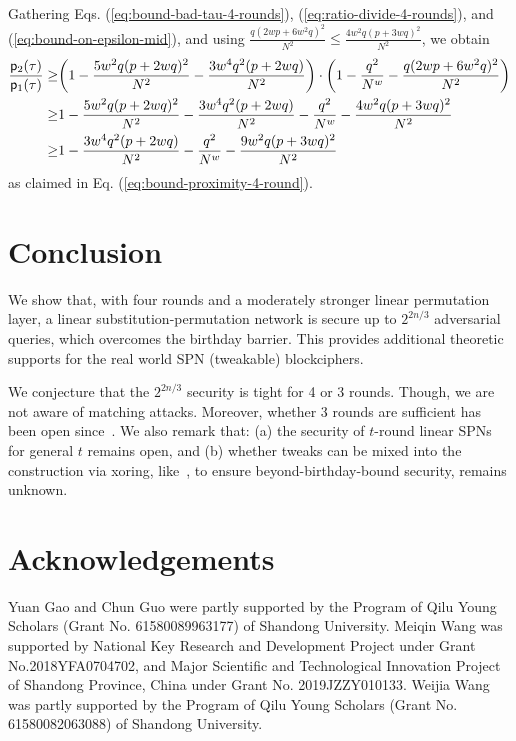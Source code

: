 \documentclass[journal=tosc,final,nohyperref]{iacrtrans}
\begin{document}
Gathering Eqs. (\ref{eq:bound-bad-tau-4-rounds}), (\ref{eq:ratio-divide-4-rounds}), and (\ref{eq:bound-on-epsilon-mid}), and using $\frac{q(2wp+6w^2q)^2}{N^2}\leq\frac{4w^2q(p+3wq)^2}{N^2}$, we obtain
%
\begin{align*}
\frac{\mathsf{p}_{2}(\tau)}{\mathsf{p}_{1}(\tau)}   \geq   & \bigg(1-
%
\frac{5w^2q(p+2wq)^2}{N^2}-
\frac{3w^4q^2(p+2wq)}{N^2}
%
\bigg)\cdot\bigg(1-\frac{q^2}{N^w}-\frac{q(2wp+6w^2q)^2}{N^2}\bigg)     \notag      \\
\geq  &  1-\frac{5w^2q(p+2wq)^2}{N^2}-
\frac{3w^4q^2(p+2wq)}{N^2}-\frac{q^2}{N^w}-\frac{4w^2q(p+3wq)^2}{N^2}     \notag        \\
\geq  &  1-
\frac{3w^4q^2(p+2wq)}{N^2}-\frac{q^2}{N^w}-\frac{9w^2q(p+3wq)^2}{N^2}     \notag   
\end{align*}
%
as claimed in Eq. (\ref{eq:bound-proximity-4-round}).





\section{Conclusion}

We show that, with four rounds and a moderately stronger linear permutation layer, a linear substitution-permutation network is secure up to $2^{2n/3}$ adversarial queries, which overcomes the birthday barrier. This provides additional theoretic supports for the real world SPN (tweakable) blockciphers.

We conjecture that the $2^{2n/3}$ security is tight for 4 or 3 rounds. Though, we are not aware of matching attacks. Moreover, whether 3 rounds are sufficient has been open since~\cite{EPRINT:DKSTZ17}. We also remark that: (a) the security of $t$-round linear SPNs for general $t$ remains open, and (b) whether tweaks can be mixed into the construction via xoring, like~\cite{AC:CogSeu15}, to ensure beyond-birthday-bound security, remains unknown.



\section*{Acknowledgements}

Yuan Gao and Chun Guo were partly supported by the Program of Qilu Young Scholars (Grant No. 61580089963177) of Shandong University. Meiqin Wang was supported by National Key Research and Development Project under Grant No.2018YFA0704702, and Major Scientific and Technological Innovation Project of Shandong Province, China under Grant No. 2019JZZY010133. Weijia Wang was partly supported by the Program of Qilu Young Scholars (Grant No. 61580082063088) of Shandong University.
\end{document}
